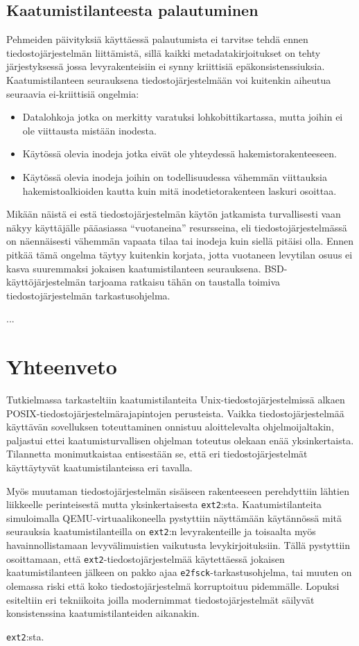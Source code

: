 \subsection{Kaatumistilanteesta palautuminen}
Pehmeiden päivityksiä käyttäessä palautumista ei tarvitse tehdä ennen tiedostojärjestelmän liittämistä,
sillä kaikki metadatakirjoitukset on tehty järjestyksessä jossa levyrakenteisiin ei synny kriittisiä epäkonsistenssiuksia.
Kaatumistilanteen seurauksena tiedostojärjestelmään voi kuitenkin aiheutua seuraavia ei-kriittisiä ongelmia:
\begin{itemize}
    \item{Datalohkoja jotka on merkitty varatuksi lohkobittikartassa, mutta joihin ei ole viittausta mistään inodesta.}
    \item{Käytössä olevia inodeja jotka eivät ole yhteydessä hakemistorakenteeseen.}
    \item{Käytössä olevia inodeja joihin on todellisuudessa vähemmän viittauksia hakemistoalkioiden kautta kuin mitä inodetietorakenteen laskuri osoittaa.}
\end{itemize}
Mikään näistä ei estä tiedostojärjestelmän käytön jatkamista turvallisesti vaan näkyy käyttäjälle pääasiassa ``vuotaneina'' resursseina,
eli tiedostojärjestelmässä on näennäisesti vähemmän vapaata tilaa tai inodeja kuin siellä pitäisi olla.
Ennen pitkää tämä ongelma täytyy kuitenkin korjata,
jotta vuotaneen levytilan osuus ei kasva suuremmaksi jokaisen kaatumistilanteen seurauksena.
BSD-käyttöjärjestelmän tarjoama ratkaisu tähän on taustalla toimiva tiedostojärjestelmän tarkastusohjelma.

...

\section{Yhteenveto}
Tutkielmassa tarkasteltiin kaatumistilanteita Unix-tiedostojärjestelmissä alkaen POSIX-tiedostojärjestelmärajapintojen perusteista.
Vaikka tiedostojärjestelmää käyttävän sovelluksen toteuttaminen onnistuu aloittelevalta ohjelmoijaltakin,
paljastui ettei kaatumisturvallisen ohjelman toteutus olekaan enää yksinkertaista.
Tilannetta monimutkaistaa entisestään se,
että eri tiedostojärjestelmät käyttäytyvät kaatumistilanteissa eri tavalla.

Myös muutaman tiedostojärjestelmän sisäiseen rakenteeseen perehdyttiin lähtien liikkeelle perinteisestä mutta yksinkertaisesta \texttt{ext2}:sta.
Kaatumistilanteita simuloimalla QEMU-virtuaalikoneella pystyttiin näyttämään käytännössä mitä seurauksia kaatumistilanteilla on \texttt{ext2}:n levyrakenteille
ja toisaalta myös havainnollistamaan levyvälimuistien vaikutusta levykirjoituksiin.
Tällä pystyttiin osoittamaan,
että \texttt{ext2}-tiedostojärjestelmää käytettäessä jokaisen kaatumistilanteen jälkeen on pakko ajaa \texttt{e2fsck}-tarkastusohjelma,
tai muuten on olemassa riski että koko tiedostojärjestelmä korruptoituu pidemmälle.
Lopuksi esiteltiin eri tekniikoita joilla modernimmat tiedostojärjestelmät säilyvät konsistenssina kaatumistilanteiden aikanakin.

\texttt{ext2}:sta.
